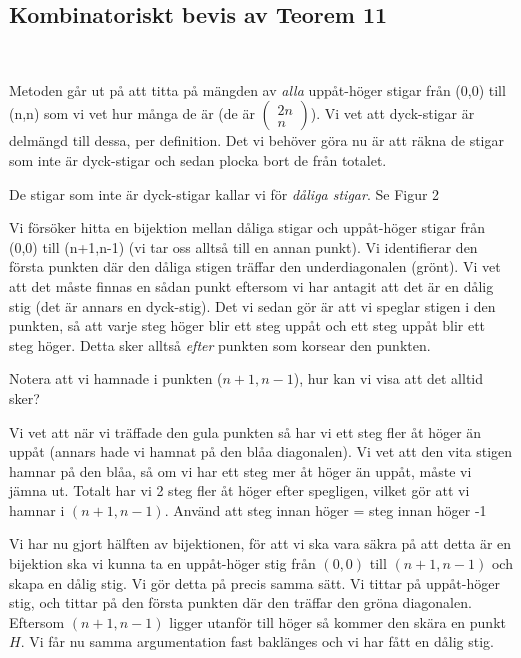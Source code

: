\subsection{Kombinatoriskt bevis av Teorem 11}\hfill\\
\newpage
\begin{prf}[]{}
  Metoden går ut på att titta på mängden av \textit{alla} uppåt-höger stigar från (0,0) till (n,n) som vi vet hur många de är (de är $\begin{pmatrix}2n\\n\end{pmatrix}$). Vi vet att dyck-stigar är delmängd till dessa, per definition. Det vi behöver göra nu är att räkna de stigar som inte är dyck-stigar och sedan plocka bort de från totalet.\par
  \noindent De stigar som inte är dyck-stigar kallar vi för \textit{dåliga stigar}. Se Figur 2
  \par\bigskip
  \noindent Vi försöker hitta en bijektion mellan dåliga stigar och uppåt-höger stigar från (0,0) till (n+1,n-1) (vi tar oss alltså till en annan punkt). Vi identifierar den första punkten där den dåliga stigen träffar den underdiagonalen (grönt). Vi vet att det måste finnas en sådan punkt eftersom vi har antagit att det är en dålig stig (det är annars en dyck-stig). Det vi sedan gör är att vi speglar stigen i den punkten, så att varje steg höger blir ett steg uppåt och ett steg uppåt blir ett steg höger. Detta sker alltså \textit{efter} punkten som korsear den punkten.
  \par\bigskip
  \noindent Notera att vi hamnade i punkten ($n+1,n-1$), hur kan vi visa att det alltid sker?\par
  \noindent Vi vet att när vi träffade den gula punkten så har vi ett steg fler åt höger än uppåt (annars hade vi hamnat på den blåa diagonalen). Vi vet att den vita stigen hamnar på den blåa, så om vi har ett steg mer åt höger än uppåt, måste vi jämna ut. Totalt har vi 2 steg fler åt höger efter spegligen, vilket gör att vi hamnar i $(n+1,n-1)$. Använd att steg innan höger = steg innan höger -1
  \par\bigskip
  \noindent Vi har nu gjort hälften av bijektionen, för att vi ska vara säkra på att detta är en bijektion ska vi kunna ta en uppåt-höger stig från $(0,0)$ till $(n+1,n-1)$ och skapa en dålig stig. Vi gör detta på precis samma sätt. Vi tittar på uppåt-höger stig, och tittar på den första punkten där den träffar den gröna diagonalen. Eftersom $(n+1,n-1)$  ligger utanför till höger så kommer den skära en punkt $H$. Vi får nu samma argumentation fast baklänges och vi har fått en dålig stig.

\end{prf}
